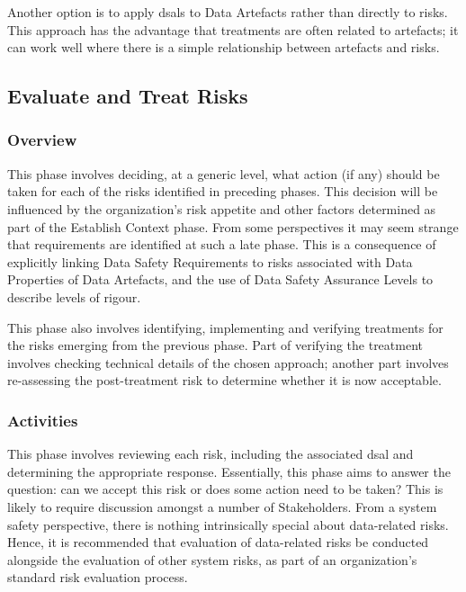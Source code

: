 Another option is to apply \glspl{dsal} to Data Artefacts rather than directly to risks. This approach has the advantage that treatments are often related to artefacts; it can work well where there is a simple relationship between artefacts and risks.

\subsection{Evaluate and Treat Risks}
\subsubsection{Overview}
This phase involves deciding, at a generic level, what action (if any) should be taken for each of the risks identified in preceding phases. This decision will be influenced by the organization's risk appetite and other factors determined as part of the Establish Context phase. From some perspectives it may seem strange that requirements are identified at such a late phase. This is a consequence of explicitly linking Data Safety Requirements to risks associated with Data Properties of Data Artefacts, and the use of Data Safety Assurance Levels to describe levels of rigour. 

This phase also involves identifying, implementing and verifying treatments for the risks emerging from the previous phase. Part of verifying the treatment involves checking technical details of the chosen approach; another part involves re-assessing the post-treatment risk to determine whether it is now acceptable.

\subsubsection{Activities}
This phase involves reviewing each risk, including the associated \gls{dsal} and determining the appropriate response. Essentially, this phase aims to answer the question: can we accept this risk or does some action need to be taken? This is likely to require discussion amongst a number of Stakeholders. From a system safety perspective, there is nothing intrinsically special about data-related risks. Hence, it is recommended that evaluation of data-related risks be conducted alongside the evaluation of other system risks, as part of an organization's standard risk evaluation process.

